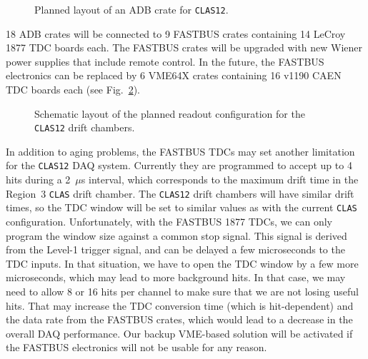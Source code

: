 \begin{figure}[ht]
\vspace{12.0cm}
\caption{\small{Planned layout of an ADB crate for {\tt CLAS12}.}}
\label{fig:ADB1} 
\end{figure}

18 ADB crates will be connected to 9 FASTBUS crates containing 14 LeCroy 
1877 TDC boards each.  The FASTBUS crates will be upgraded with new Wiener 
power supplies that include remote control.  In the future, the FASTBUS
electronics can be replaced by 6 VME64X crates containing 16 v1190
CAEN TDC boards each (see Fig.~\ref{fig:DC1}).

\begin{figure}[ht]
\vspace{13.0cm}
\caption{\small{Schematic layout of the planned readout configuration
for the {\tt CLAS12} drift chambers.}}
\label{fig:DC1} 
\end{figure}

In addition to aging problems, the FASTBUS TDCs may set another limitation 
for the {\tt CLAS12} DAQ system.  Currently they are programmed to accept 
up to 4 hits during a 2~$\mu$s interval, which corresponds to the maximum 
drift time in the Region~3 {\tt CLAS} drift chamber. The {\tt CLAS12} drift 
chambers will have similar drift times, so the TDC window will be set to similar 
values as with the current {\tt CLAS} configuration.  Unfortunately, with the 
FASTBUS 1877 TDCs, we can only program the window size against a common stop 
signal.  This signal is derived from the Level-1 trigger signal, and can be 
delayed a few microseconds to the TDC inputs.  In that situation, we have to open 
the TDC window by a few more microseconds, which may lead to more background 
hits.  In that case, we may need to allow 8 or 16 hits per channel to make 
sure that we are not losing useful hits.  That may increase the TDC conversion 
time (which is hit-dependent) and the data rate from the FASTBUS crates, which
would lead to a decrease in the overall DAQ performance.  Our backup VME-based 
solution will be activated if the FASTBUS electronics will not be usable for 
any reason.


